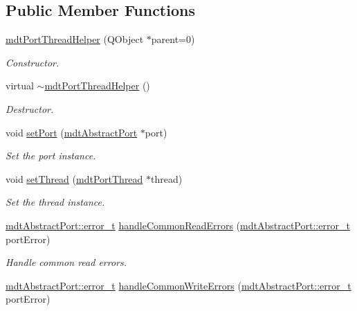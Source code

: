 \subsection*{Public Member Functions}
\begin{DoxyCompactItemize}
\item 
\hyperlink{classmdt_port_thread_helper_a6e3b234e868b9918a26866ffeee4c0ca}{mdt\-Port\-Thread\-Helper} (Q\-Object $\ast$parent=0)
\begin{DoxyCompactList}\small\item\em Constructor. \end{DoxyCompactList}\item 
virtual \hyperlink{classmdt_port_thread_helper_a5d086b22714a73fe2286f096b4cddaf9}{$\sim$mdt\-Port\-Thread\-Helper} ()
\begin{DoxyCompactList}\small\item\em Destructor. \end{DoxyCompactList}\item 
void \hyperlink{classmdt_port_thread_helper_a4127c0b28dc63df06b5a36a4be8b3bb7}{set\-Port} (\hyperlink{classmdt_abstract_port}{mdt\-Abstract\-Port} $\ast$port)
\begin{DoxyCompactList}\small\item\em Set the port instance. \end{DoxyCompactList}\item 
void \hyperlink{classmdt_port_thread_helper_af6c9d2cb2e9e922942236068bf634b0b}{set\-Thread} (\hyperlink{classmdt_port_thread}{mdt\-Port\-Thread} $\ast$thread)
\begin{DoxyCompactList}\small\item\em Set the thread instance. \end{DoxyCompactList}\item 
\hyperlink{classmdt_abstract_port_ad4121bb930c95887e77f8bafa065a85e}{mdt\-Abstract\-Port\-::error\-\_\-t} \hyperlink{classmdt_port_thread_helper_a53d0eacc7048cf32566785a7fb527458}{handle\-Common\-Read\-Errors} (\hyperlink{classmdt_abstract_port_ad4121bb930c95887e77f8bafa065a85e}{mdt\-Abstract\-Port\-::error\-\_\-t} port\-Error)
\begin{DoxyCompactList}\small\item\em Handle common read errors. \end{DoxyCompactList}\item 
\hyperlink{classmdt_abstract_port_ad4121bb930c95887e77f8bafa065a85e}{mdt\-Abstract\-Port\-::error\-\_\-t} \hyperlink{classmdt_port_thread_helper_a84871009b6128912f7d3869b14e37aa2}{handle\-Common\-Write\-Errors} (\hyperlink{classmdt_abstract_port_ad4121bb930c95887e77f8bafa065a85e}{mdt\-Abstract\-Port\-::error\-\_\-t} port\-Error)

\end{DoxyCompactItemize}
